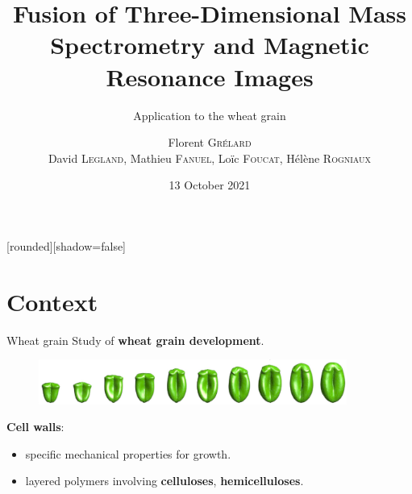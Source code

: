 \documentclass[10pt]{beamer}
\title{Fusion of Three-Dimensional Mass Spectrometry and Magnetic Resonance Images}
\subtitle{\normalsize Application to the wheat grain}
\institute{OurCon 2021}
\author{{Florent \textsc{Grélard}\\
    David \textsc{Legland}, Mathieu \textsc{Fanuel}, Loïc \textsc{Foucat}, Hélène \textsc{Rogniaux}}}
\begin{document}
[rounded][shadow=false]

\date{\vspace{0.2cm}13 October 2021} %



\makeatletter
\AtBeginPart{%
  \beamer@tocsectionnumber=0\relax
  \setcounter{section}{0}
}
\makeatother

\begin{frame}[plain]
  \titlepage
\end{frame}

\section{Context}
\begin{frame}{Wheat grain}
  Study of \textbf{wheat grain development}.

  \begin{figure}[ht]
    \centering
    \includegraphics[width=0.9\textwidth]{fig/stages}
  \end{figure}

  
  \textbf{Cell walls}:
  \begin{itemize}
  \item specific mechanical properties for growth.
  \item layered polymers involving \textbf{celluloses}, \textbf{hemicelluloses}.
  \end{itemize}

  

\end{frame}
\end{document}
